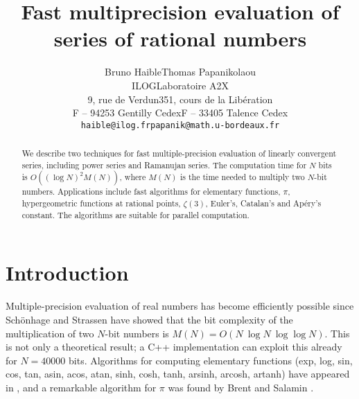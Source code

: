 

\title{Fast multiprecision evaluation of series of rational numbers}

\author{
\begin{tabular}{ccc}
{Bruno Haible} & \hspace*{2cm} & {Thomas Papanikolaou}\\
{\normalsize ILOG} && {\normalsize Laboratoire A2X}\\
{\normalsize 9, rue de Verdun} && {\normalsize 351, cours de la Lib\'eration}\\
{\normalsize F -- 94253 Gentilly Cedex} && {\normalsize F -- 33405 Talence Cedex}\\
{\normalsize {\tt haible@ilog.fr}} && {\normalsize {\tt papanik@math.u-bordeaux.fr}}\\
\end{tabular}
}

\maketitle

\begin{abstract}

We describe two techniques for fast multiple-precision evaluation of linearly
convergent series, including power series and Ramanujan series. The computation
time for \(N\) bits is  \( O((\log N)^{2}M(N)) \), where \( M(N) \) is the time
needed to multiply two \(N\)-bit numbers. Applications include fast algorithms
for elementary functions,  \(\pi\), hypergeometric functions at rational points,
$\zeta(3)$, Euler's, Catalan's and Ap{\'e}ry's constant. The algorithms are
suitable for parallel computation.

\end{abstract}

\section{Introduction}

Multiple-precision evaluation of real numbers has become efficiently possible
since Sch\"onhage and Strassen \cite{71} have showed that the bit complexity of
the multiplication of two \(N\)-bit numbers is
\( M(N)=O(N\:\log N\:\log\log N) \).
This is not only a theoretical result; a C++ implementation \cite{96a} can
exploit this already for  \( N=40000 \) bits. Algorithms for computing
elementary functions (exp, log, sin, cos, tan, asin, acos, atan, sinh, cosh,
tanh, arsinh, arcosh, artanh) have appeared in \cite{76b}, and a remarkable
algorithm for \( \pi \) was found by Brent and Salamin \cite{76c}.

